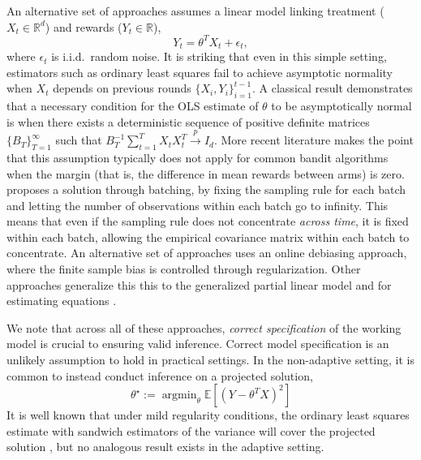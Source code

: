 \documentclass[11pt]{article}
\newcommand{\R}{\mathbb{R}}
\DeclareMathOperator*{\argmin}{argmin}
\begin{document}
An alternative set of approaches assumes a linear model linking treatment ($X_{t} \in \R^{d}$) and rewards ($Y_{t} \in \R$),
$$ Y_{t} = \theta^{T}X_{t} + \epsilon_{t},$$ where $\epsilon_t$ is i.i.d.\ random noise. 
It is striking that even in this simple setting, estimators such as ordinary least squares fail to achieve asymptotic normality when $X_{t}$ depends on previous rounds $\{X_{i},Y_{i}\}_{i=1}^{t-1}$. A classical result \citep{1982laiwei} demonstrates that a necessary condition for the OLS estimate of $\theta$ to be asymptotically normal is when there exists a deterministic sequence of positive definite matrices $\{B_{T}\}_{T=1}^{\infty}$ such that $B_{T}^{-1}\sum_{t=1}^{T}X_{t}X_{t}^{T} \overset{p}{\to} I_{d}$. More recent literature \citep{NEURIPS2020_6fd86e0a,pmlr-v80-deshpande18a,khamaru2021near} makes the point that this assumption typically does not apply for common bandit algorithms when the margin (that is, the difference in mean rewards between arms) is zero. \cite{NEURIPS2020_6fd86e0a} proposes a solution through batching, by fixing the sampling rule for each batch and letting the number of observations within each batch go to infinity. This means that even if the sampling rule does not concentrate \emph{across time}, it is fixed within each batch, allowing the empirical covariance matrix within each batch to concentrate. An alternative set of approaches \citep{pmlr-v80-deshpande18a,khamaru2021near} uses an online debiasing approach, where the finite sample bias is controlled through regularization. Other approaches generalize this this to the generalized partial linear model \cite{10.1214/24-AOS2485} and for estimating equations \citep{NEURIPS2023_a399456a}. 


We note that across all of these approaches, \emph{correct specification} of the working model is crucial to ensuring valid inference. Correct model specification is an unlikely assumption to hold in practical settings. In the non-adaptive setting, it is common to instead conduct inference on a projected solution, 
\begin{equation} \label{eqn:projected_linear}
\theta^{\star}:=\argmin_{\theta}\mathbb{E}\left[\left(Y - \theta^{T}X\right)^{2}\right]
\end{equation}
It is well known that under mild regularity conditions, the ordinary least squares estimate with sandwich estimators of the variance will cover the projected solution \citep{white1982maximum}, but no analogous result exists in the adaptive setting. 
\end{document}
